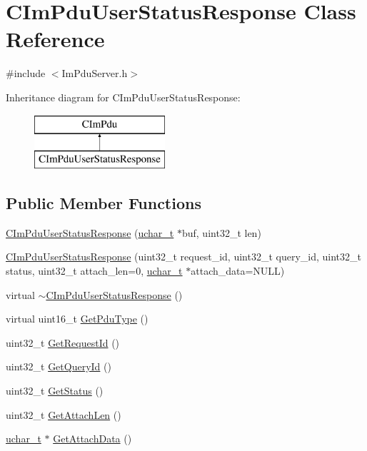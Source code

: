 \hypertarget{class_c_im_pdu_user_status_response}{}\section{C\+Im\+Pdu\+User\+Status\+Response Class Reference}
\label{class_c_im_pdu_user_status_response}


{\ttfamily \#include $<$Im\+Pdu\+Server.\+h$>$}

Inheritance diagram for C\+Im\+Pdu\+User\+Status\+Response\+:\begin{figure}[H]
\begin{center}
\leavevmode
\includegraphics[height=2.000000cm]{class_c_im_pdu_user_status_response}
\end{center}
\end{figure}
\subsection*{Public Member Functions}
\begin{DoxyCompactItemize}
\item 
\hyperlink{class_c_im_pdu_user_status_response_a2b224c1f1d3edea27746854180eb0321}{C\+Im\+Pdu\+User\+Status\+Response} (\hyperlink{base_2ostype_8h_a124ea0f8f4a23a0a286b5582137f0b8d}{uchar\+\_\+t} $\ast$buf, uint32\+\_\+t len)
\item 
\hyperlink{class_c_im_pdu_user_status_response_a54bab789143f9201306d9f0fc34a41c0}{C\+Im\+Pdu\+User\+Status\+Response} (uint32\+\_\+t request\+\_\+id, uint32\+\_\+t query\+\_\+id, uint32\+\_\+t status, uint32\+\_\+t attach\+\_\+len=0, \hyperlink{base_2ostype_8h_a124ea0f8f4a23a0a286b5582137f0b8d}{uchar\+\_\+t} $\ast$attach\+\_\+data=N\+U\+L\+L)
\item 
virtual \hyperlink{class_c_im_pdu_user_status_response_a763057694670c2fa338402e1c423a2e5}{$\sim$\+C\+Im\+Pdu\+User\+Status\+Response} ()
\item 
virtual uint16\+\_\+t \hyperlink{class_c_im_pdu_user_status_response_a232c86a01825af07444ea09e0e5df989}{Get\+Pdu\+Type} ()
\item 
uint32\+\_\+t \hyperlink{class_c_im_pdu_user_status_response_a999784bfeaa50bc9dc485f69801ac490}{Get\+Request\+Id} ()
\item 
uint32\+\_\+t \hyperlink{class_c_im_pdu_user_status_response_a0395759742f59bff34fde4ff73032b8e}{Get\+Query\+Id} ()
\item 
uint32\+\_\+t \hyperlink{class_c_im_pdu_user_status_response_a033ea2d39e3dab1ab2c1dfc7769ea9ed}{Get\+Status} ()
\item 
uint32\+\_\+t \hyperlink{class_c_im_pdu_user_status_response_ae27872396e8bceb329f1fb638239e93c}{Get\+Attach\+Len} ()
\item 
\hyperlink{base_2ostype_8h_a124ea0f8f4a23a0a286b5582137f0b8d}{uchar\+\_\+t} $\ast$ \hyperlink{class_c_im_pdu_user_status_response_a882108b2d5ea6707b555424aedc0c67e}{Get\+Attach\+Data} ()
\end{DoxyCompactItemize}
